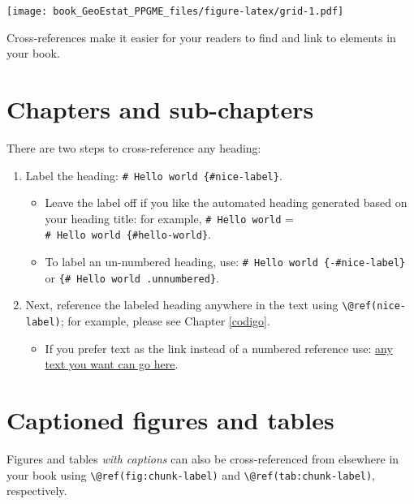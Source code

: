 \documentclass[
]{book}
\providecommand{\tightlist}{%
  \setlength{\itemsep}{0pt}\setlength{\parskip}{0pt}}
\theoremstyle{definition}
\theoremstyle{definition}
\theoremstyle{definition}
\theoremstyle{definition}
\theoremstyle{remark}
\begin{document}
\texttt{[image: book\_GeoEstat\_PPGME\_files/figure-latex/grid-1.pdf]}

Cross-references make it easier for your readers to find and link to elements in your book.

\hypertarget{chapters-and-sub-chapters}{%
\section{Chapters and sub-chapters}\label{chapters-and-sub-chapters}}

There are two steps to cross-reference any heading:

\begin{enumerate}
\def\labelenumi{\arabic{enumi}.}
\tightlist
\item
  Label the heading: \texttt{\#\ Hello\ world\ \{\#nice-label\}}.

  \begin{itemize}
  \tightlist
  \item
    Leave the label off if you like the automated heading generated based on your heading title: for example, \texttt{\#\ Hello\ world} = \texttt{\#\ Hello\ world\ \{\#hello-world\}}.
  \item
    To label an un-numbered heading, use: \texttt{\#\ Hello\ world\ \{-\#nice-label\}} or \texttt{\{\#\ Hello\ world\ .unnumbered\}}.
  \end{itemize}
\item
  Next, reference the labeled heading anywhere in the text using \texttt{\textbackslash{}@ref(nice-label)}; for example, please see Chapter \ref{codigo}.

  \begin{itemize}
  \tightlist
  \item
    If you prefer text as the link instead of a numbered reference use: \protect\hyperlink{codigo}{any text you want can go here}.
  \end{itemize}
\end{enumerate}

\hypertarget{captioned-figures-and-tables}{%
\section{Captioned figures and tables}\label{captioned-figures-and-tables}}

Figures and tables \emph{with captions} can also be cross-referenced from elsewhere in your book using \texttt{\textbackslash{}@ref(fig:chunk-label)} and \texttt{\textbackslash{}@ref(tab:chunk-label)}, respectively.
\end{document}
